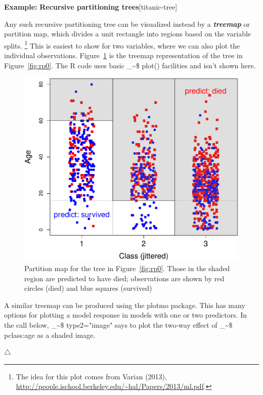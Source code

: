 \documentclass{article}
\makeatletter
\newenvironment{knitrout}{}{} %
\newcommand{\figref}[1]{Figure~\ref{#1}}
\newcommand\code{\bgroup\@makeother\_\@makeother\~\@makeother\$\@codex}
\def\@codex#1{{\normalfont\ttfamily\hyphenchar\font=-1 #1}\egroup}
\newcommand{\func}[1]{\code{#1()}}
\let\proglang=\textsf
\newcommand{\R}{\proglang{R}\xspace}
\newcommand{\pkg}[1]{\textsf{#1}\nocite{R-#1}}
\newcommand{\Rpackage}[1]{\pkg{#1} package}
\newcommand{\glossterm}[1]{\textit{\textbf{#1}}}
\newenvironment{Example}[2][unnamed-example]%
  {\medskip\noindent\textbf{\textsf{Example:}}
   \textbf{#2}\hfill [#1]\par\smallskip
  }
  {\hfill $\triangle$}
\makeatother
\begin{document}
\begin{Example}[titanic-tree]{Recursive partitioning trees}
Any such recursive partitioning tree can be visualized instead by a
\glossterm{treemap} or partition map, which divides a unit rectangle
into regions based on the variable splits.%
\footnote{
The idea for this plot comes from Varian (2013),
\url{http://people.ischool.berkeley.edu/~hal/Papers/2013/ml.pdf}.
}
This is easiest to show
for two variables, where we can also plot the individual observations.
\figref{fig:partition-map1} is the treemap representation of the
tree in \figref{fig:rp0}.  The \R code uses basic \func{plot} facilities
and isn't shown here.

\begin{knitrout}
\color{fgcolor}\begin{figure}[hbt!]


{\centering \includegraphics[width=0.7\linewidth]{figure/partition-map1} 

}

\caption[]{Partition map for the tree in \figref{fig:rp0}.  Those in the shaded region are predicted to have died; observations are shown by red circles (died) and blue squares (survived)\label{fig:partition-map1}}
\end{figure}


\end{knitrout}


A similar treemap can be produced using the \Rpackage{plotmo}.  This has many
options for plotting a model response in models with one or two predictors.
In the call below, \code{type2="image"} says to plot the two-way effect
of \code{pclass:age} as a shaded image.


\end{Example}
\end{document}
